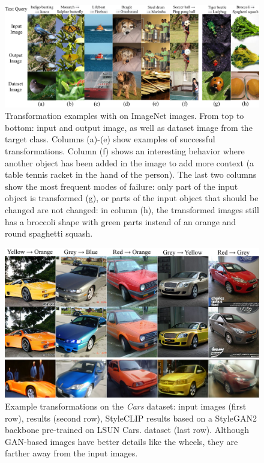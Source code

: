 \begin{figure}[h!]
    \centering
    \includegraphics[width=\linewidth]{images/flexit/assets/main_exs.pdf}
    \caption{Transformation examples with \ours on ImageNet images. 
    From top to bottom: input and output image, as well as dataset image from the target
     class.
    Columns (a)-(e) show examples of successful transformations. Column (f) shows an
     interesting behavior where another object has been added in the image to add more 
     context (a table tennis racket in the hand of the person). The  last two columns 
      show the most frequent modes of failure: only part of the input object is
       transformed (g), or parts of the input object that should be changed are not 
       changed: in column (h), the transformed images still has a broccoli shape with 
       green parts instead of an orange and round spaghetti squash.
    }
\label{fig:visuresu}
\end{figure}


\begin{figure}[h!]
    \centering
    \vspace{-1em}
    \includegraphics[width=\linewidth]{images/flexit/assets/cars2.pdf}
    \caption{Example  transformations on the \textit{Cars} dataset:  input images (first row),  \ours results  (second row), StyleCLIP results based on a  StyleGAN2 backbone pre-trained on LSUN Cars.
    dataset (last row). Although GAN-based images have better details like the wheels, they are farther away from the input images.}
\label{fig:cars30k}
\end{figure}

